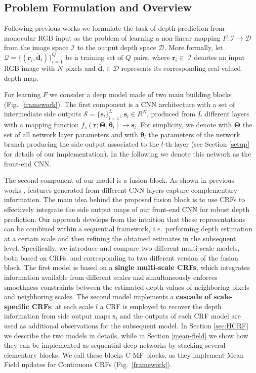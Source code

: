\documentclass[10pt,twocolumn,letterpaper]{article}
\newcommand{\vect}[1]{\mathbf{#1}}
\def\ie{\textit{i.e.}~}
\begin{document}
\subsection{Problem Formulation and Overview}
Following previous works we formulate the task of depth prediction from monocular RGB input as the problem of learning a non-linear mapping 
$F:\mathcal{I} \rightarrow \mathcal{D}$ from the image space $\mathcal{I}$ to the output depth space $\mathcal{D}$. More formally, let $\mathcal{Q} = \{ (\vect{r}_i, \bar{\vect{d}}_i)\}_{i=1}^Q$ be a training set of $Q$ pairs, 
where $\vect{r}_i \in~\mathcal{I}$ denotes an input RGB image with $N$ pixels and $\bar{\vect{d}}_i \in\mathcal{D}$ represents its corresponding real-valued depth map. 

For learning $F$ we consider a deep model made of two main building blocks (Fig.~\ref{framework}). The first component is a CNN architecture with 
a set of intermediate side outputs $\mathcal{S}=\{ \vect{s}_{l} \}_{l=1}^{L}$, $\vect{s}_{l} \in R^N$, produced from $L$ different layers 
with a mapping function $f_s(\vect{r}; \mathbf{\Theta}, \boldsymbol{\theta}_{l}) \rightarrow \vect{s}_{l}$. 
For simplicity, we denote with $\mathbf{\Theta}$ the set of all network layer parameters and with $\boldsymbol{\theta}_{l}$ the parameters of 
the network branch producing the side output associated to the {$l$-th} layer (see Section \ref{setup} for details of our implementation). In the following we denote this network as the front-end CNN.

The second component of our model is a fusion block. As shown in previous works \cite{long2015fully,bertasius2015deepedge,xie2015holistically}, 
features generated from different 
CNN layers capture complementary information. The main idea behind the proposed fusion block
is to use CRFs to effectively integrate the side output maps of our front-end CNN for robust depth prediction. Our approach develops from the intuition that these representations can be combined within a sequential framework, \ie performing depth estimation at a certain scale
and then refining the obtained estimates in the subsequent level.
Specifically, we introduce and compare two different multi-scale models, both based on CRFs, and corresponding to two different version of the
fusion block. The first model is based on a \textbf{single multi-scale CRFs}, which integrates information
available from different scales and simultaneously enforces smoothness constraints between the estimated depth values of
neighboring pixels and neighboring scales. The second model implements a \textbf{cascade of scale-specific CRFs}: at each scale $l$
a CRF is employed to recover the depth information from side output maps $\mathbf{s}_l$ and the 
outputs of each CRF model are
used as additional observations for the subsequent model.
In Section \ref{sec:HCRF} we describe the two models in details, while in Section \ref{mean-field}
we show how they can be implemented as sequential deep networks by 
stacking several elementary blocks. We call these blocks C-MF blocks, as they implement Mean Field updates for Continuous CRFs (Fig.~\ref{framework}).
\end{document}
